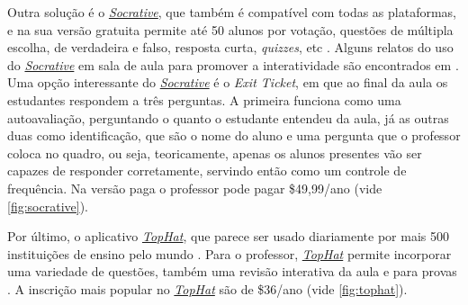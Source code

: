 Outra solução é o \href{http://www.socrative.com/}{\textit{Socrative}},
que também é compatível com todas as plataformas, e na sua versão gratuita
permite até 50 alunos por votação, questões de múltipla escolha, de verdadeira e falso,
resposta curta, \textit{quizzes}, etc \cite{socrative2016}. Alguns relatos do uso do
\href{http://www.socrative.com/}{\textit{Socrative}} em sala de aula para promover
a interatividade são encontrados em \cite{Kaya2016, Trindade2014}.
Uma opção interessante do \href{http://www.socrative.com/}{\textit{Socrative}}
é o \textit{Exit Ticket}, em que ao final da aula os estudantes respondem
a três perguntas. A primeira funciona como uma autoavaliação, perguntando
o quanto o estudante entendeu da aula, já as outras duas como identificação, que são o
nome do aluno e uma pergunta que o professor coloca no quadro, ou seja, teoricamente,
apenas os alunos presentes vão ser capazes de responder corretamente, servindo
então como um controle de frequência. Na versão paga o professor pode pagar \$49,99/ano (vide \autoref{fig:socrative}).

Por último, o aplicativo \href{http://www.tophat.com/}{\textit{TopHat}}, que parece
ser usado diariamente por mais 500 instituições de ensino pelo mundo \cite{tophat2016}.
Para o professor, \href{http://www.tophat.com/}{\textit{TopHat}} permite incorporar
uma variedade de questões, também uma revisão interativa da aula e para provas
\cite{Neilson2016, Lantz2014}. A inscrição mais popular no  \href{http://www.tophat.com/}{\textit{TopHat}}
são de \$36/ano (vide \autoref{fig:tophat}).

